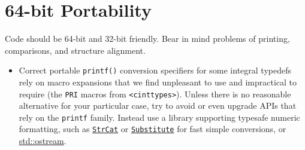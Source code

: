 
\section{64-bit Portability}\label{sec:64-bit-portability}
Code should be 64-bit and 32-bit friendly. Bear in mind problems of printing, comparisons, and structure alignment.
\begin{itemize}
    \item Correct portable \texttt{printf()} conversion specifiers for some integral typedefs rely on macro expansions that we find unpleasant to use and impractical to require (the \texttt{PRI} macros from \texttt{<cinttypes>}). Unless there is no reasonable alternative for your particular case, try to avoid or even upgrade APIs that rely on the \texttt{printf} family. Instead use a library supporting typesafe numeric formatting, such as \href{https://github.com/abseil/abseil-cpp/blob/master/absl/strings/str_cat.h}{\texttt{StrCat}} or \href{https://github.com/abseil/abseil-cpp/blob/master/absl/strings/substitute.h}{\texttt{Substitute}} for fast simple conversions, or \hyperref[sec:streams]{std::ostream}.


\end{itemize}
